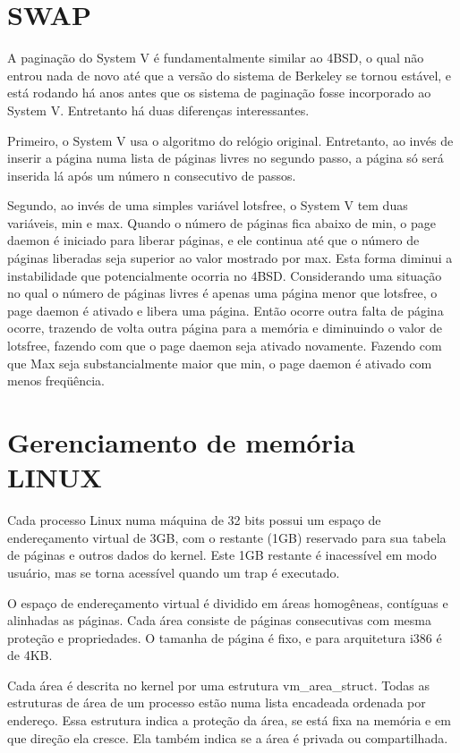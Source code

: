 \section{SWAP}

A paginação do System V é fundamentalmente similar ao 4BSD, o qual não entrou nada de novo até que a versão do sistema de Berkeley se tornou estável, e está rodando há anos antes que os sistema de paginação fosse incorporado ao System V. Entretanto há duas diferenças interessantes.

Primeiro, o System V usa o algoritmo do relógio original. Entretanto, ao invés de inserir a página numa lista de páginas livres no segundo passo, a página só será inserida lá após um número n consecutivo de passos.

Segundo, ao invés de uma simples variável lotsfree, o System V tem duas variáveis, min e max. Quando o número de páginas fica abaixo de min, o page daemon é iniciado para liberar páginas, e ele continua até que o número de páginas liberadas seja superior ao valor mostrado por max. Esta forma diminui a instabilidade que potencialmente ocorria no 4BSD. Considerando uma situação no qual o número de páginas livres é apenas uma página menor que lotsfree, o page daemon é ativado e libera uma página. Então ocorre outra falta de página ocorre, trazendo de volta outra página para a memória e diminuindo o valor de lotsfree, fazendo com que o page daemon seja ativado novamente. Fazendo com que Max seja substancialmente maior que min, o page daemon é ativado com menos freqüência.

\section{Gerenciamento de memória LINUX}

Cada processo Linux numa máquina de 32 bits possui um espaço de endereçamento virtual de 3GB, com o restante (1GB) reservado para sua tabela de páginas e outros dados do kernel. Este 1GB restante é inacessível em modo usuário, mas se torna acessível quando um trap é executado.

O espaço de endereçamento virtual é dividido em áreas homogêneas, contíguas e alinhadas as páginas. Cada área consiste de páginas consecutivas com mesma proteção e propriedades. O tamanha de página é fixo, e para arquitetura i386 é de 4KB.

Cada área é descrita no kernel por uma estrutura vm\_area\_struct. Todas as estruturas de área de um processo estão numa lista encadeada ordenada por endereço. Essa estrutura indica a proteção da área, se está fixa na memória e em que direção ela cresce. Ela também indica se a área é privada ou compartilhada.


